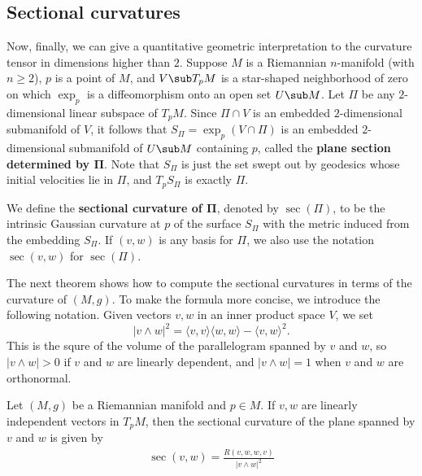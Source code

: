 \subsection{Sectional curvatures}
Now, finally, we can give a quantitative geometric interpretation to the curvature tensor in dimensions higher than $2$. Suppose $M$ is a Riemannian $n$-manifold (with 
$n\geq 2$), $p$ is a point of $M$, and $V\sub T_pM$ is a star-shaped neighborhood of zero on which $\exp_p$ is a diffeomorphism onto an open set $U\sub M$. Let $\Pi$ be 
any $2$-dimensional linear subspace of $T_pM$. Since $\Pi\cap V$ is an embedded $2$-dimensional submanifold of $V$, it follows that $S_{\Pi}=\exp_p(V\cap\Pi)$ is an 
embedded $2$-dimensional submanifold of $U\sub M$ containing $p$, called the \textbf{plane section determined by $\bm{\Pi}$}. Note that $S_{\Pi}$ is just the set swept 
out by geodesics whose initial velocities lie in $\Pi$, and $T_pS_{\Pi}$ is exactly $\Pi$.\par
We define the \textbf{sectional curvature of $\bm{\Pi}$}, denoted by $\sec(\Pi)$, to be the intrinsic Gaussian curvature at $p$ of the surface $S_{\Pi}$ with the metric 
induced from the embedding $S_{\Pi}$. If $(v,w)$ is any basis for $\Pi$, we also use the notation $\sec(v,w)$ for $\sec(\Pi)$.\par
The next theorem shows how to compute the sectional curvatures in terms of the curvature of $(M,g)$. To make the formula more concise, we introduce the following 
notation. Given vectors $v,w$ in an inner product space $V$, we set
\[|v\wedge w|^2=\langle v,v\rangle\langle w,w\rangle-\langle v,w\rangle^2.\]
This is the squre of the volume of the parallelogram spanned by $v$ and $w$, so $|v\wedge w|>0$ if $v$ and $w$ are linearly dependent, and $|v\wedge w|=1$ when $v$ and 
$w$ are orthonormal.
\begin{proposition}\label{Riemann sectional curvature formula}
Let $(M,g)$ be a Riemannian manifold and $p\in M$. If $v,w$ are linearly independent vectors in $T_pM$, then the sectional curvature of the plane spanned by $v$ and $w$ 
is given by
\begin{align}\label{Riemann sectional curvature formula-1}
\sec(v,w)=\frac{R(v,w,w,v)}{|v\wedge w|^2}
\end{align}
\end{proposition}
